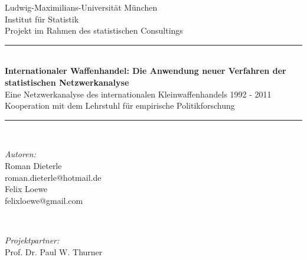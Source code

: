 \documentclass[a4paper,ngerman,oneside,titlepage,bibliography=totoc,11pt]{scrreprt}
\begin{document}
\begin{titlepage}

\newcommand{\HRule}{\rule{\linewidth}{0.5mm}} %

\center %
 

\LARGE Ludwig-Maximilians-Universität München\\[0.2cm] %
\LARGE Institut für Statistik\\[5mm]%
\large Projekt im Rahmen des statistischen Consultings\\[6mm]


\HRule \\[0.4cm]
{ \huge \bfseries Internationaler Waffenhandel:\vspace{-1.5mm} Die Anwendung neuer Verfahren der\\[1mm] statistischen Netzwerkanalyse}\\[5mm]
{ Eine Netzwerkanalyse des internationalen Kleinwaffenhandels 1992 - 2011}\\
{ Kooperation mit dem Lehrstuhl für empirische Politikforschung}\\[0.4cm] %
\HRule \\[1.5cm]
 

\begin{minipage}[t]{0.4\textwidth}
\begin{flushleft} \large
\emph{Autoren:}\\[2mm]
Roman Dieterle\\
roman.dieterle@hotmail.de\\[5mm]

Felix Loewe\\
felixloewe@gmail.com\\%
\end{flushleft}
\end{minipage}
~
\begin{minipage}[t]{0.4\textwidth}
\begin{flushright} \large
\emph{Projektpartner:}\\[2mm]
Prof. Dr. Paul W. Thurner\\[6mm]


\end{flushright}
\end{minipage}
\end{titlepage}
\end{document}
